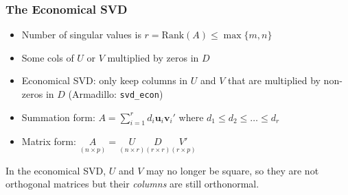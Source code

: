 \begin{frame}
  \frametitle{The Economical SVD}
\begin{itemize}
  \item Number of singular values is $r = \mbox{Rank}(A) \leq \max\{m, n\}$
  \item Some cols of $U$ or $V$ multiplied by zeros in $D$
  \item Economical SVD: only keep columns in $U$ and $V$ that are multiplied by non-zeros in $D$
  (Armadillo: \texttt{svd\_econ})
  \item Summation form: $\displaystyle A = \sum_{i=1}^r d_i \textbf{u}_i \textbf{v}_i'$ where $d_1 \leq d_2 \leq \dots \leq d_r$
\item Matrix form: $\displaystyle\underset{(n\times p)}{A} = \underset{(n\times r)}{U} \underset{(r\times r)}{D} \underset{(r\times p)}{V'}$
\end{itemize}

\vspace{1em}
\alert{In the economical SVD, $U$ and $V$ may no longer be square, so they are not orthogonal matrices but their \emph{columns} are still orthonormal.}
\end{frame}

